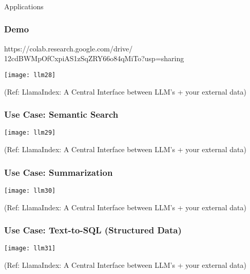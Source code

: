 \begin{frame}[fragile]\frametitle{}
\begin{center}
{\Large Applications}
\end{center}
\end{frame}

\begin{frame}[fragile]\frametitle{Demo}

https://colab.research.google.com/drive/
12cdBWMpOfCxpiAS1zSqZRY66o84qMiTo?usp=sharing 


\begin{center}
\texttt{[image: llm28]}

{\tiny (Ref: LlamaIndex: A Central Interface between LLM’s + your external data)}
\end{center}
\end{frame}


\begin{frame}[fragile]\frametitle{Use Case: Semantic Search}

\begin{center}
\texttt{[image: llm29]}

{\tiny (Ref: LlamaIndex: A Central Interface between LLM’s + your external data)}
\end{center}
\end{frame}

\begin{frame}[fragile]\frametitle{Use Case: Summarization}

\begin{center}
\texttt{[image: llm30]}

{\tiny (Ref: LlamaIndex: A Central Interface between LLM’s + your external data)}
\end{center}
\end{frame}

\begin{frame}[fragile]\frametitle{Use Case: Text-to-SQL (Structured Data)}

\begin{center}
\texttt{[image: llm31]}

{\tiny (Ref: LlamaIndex: A Central Interface between LLM’s + your external data)}
\end{center}
\end{frame}

